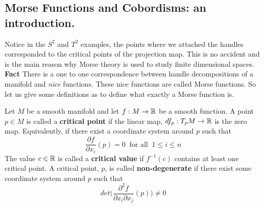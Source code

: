 \subsection{Morse Functions and Cobordisms: an introduction.}
Notice in the $S^{2}$ and $T^{2}$ examples, the points where we attached the handles corresponded to the critical points of the projection map. This is no accident and is the main reason why Morse theory is used to study finite dimensional spaces. \textbf{Fact} There is a one to one correspondence between handle decompositions of a manifold and \textit{nice} functions. These nice functions are called Morse functions. So let us give some definitions as to define what exactly a Morse function is.

\begin{definition}
Let $M$ be a smooth manifold and let $f:M\rightarrow \mathbb{R}$ be a smooth function. A point $p\in M$ is called a \textbf{critical point} if the linear map, $df_{p}:T_{p}M\rightarrow \mathbb{R}$ is the zero map. Equivalently, if there exist a coordinate system around $p$ such that 
\[
\frac{\partial f}{\partial x_{i}}(p) =0 ~ \text{ for all }~1\leq i \leq n
\]
The value $c\in \mathbb{R}$ is called a \textbf{critical value} if $f^{-1}(c)$ contains at least one critical point. A critical point, $p$, is called \textbf{non-degenerate} if there exist some coordinate system around $p$ such that 
\[
det\bigg( \frac{\partial^{2} f}{\partial x_{i}{\partial x_{j}}}(p)\bigg)\neq 0
\]
\end{definition}

